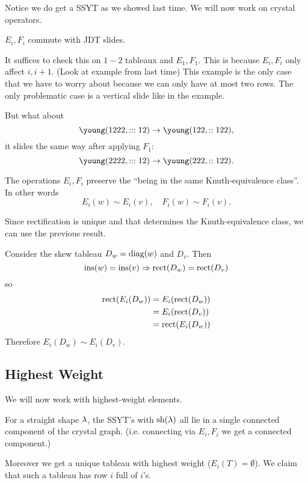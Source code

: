 \documentclass[12pt]{memoir}
\begin{document}
Notice we do get a SSYT as we showed last time. We will now work on crystal operators. 

\begin{Th}
    $E_i,F_i$ commute with JDT slides.
\end{Th}
It suffices to check this on $1-2$ tableaux and $E_1,F_1$. This is because $E_i,F_i$ only affect $i,i+1$. (Look at example from last time) This example is the only case that we have to worry about because we can only have at most two rows. The only problematic case is a vertical slide like in the example.\par 
But what about 
$$\young(1222,:::12)\to\young(122,::122),$$
it slides the same way after applying $F_1$:
$$\young(2222,:::12)\to\young(222,::122).$$

\begin{Th}
The operations $E_i,F_i$ preserve the ``being in the same Knuth-equivalence class''. In other words 
$$E_i(w)\sim E_i(v),\quad F_i(w)\sim F_i(v).$$    
\end{Th}

Since rectification is unique and that determines the Knuth-equivalence class, we can use the previous result.

\begin{ptcbr}
    Consider the skew tableau $D_w=\operatorname{diag}(w)$ and $D_v$. Then 
    $$\operatorname{ins}(w)=\operatorname{ins}(v)\Rightarrow \operatorname{rect}(D_w)=\operatorname{rect}(D_v)$$
    so 
    \begin{align*}
        \operatorname{rect}(E_i(D_w))&=E_i(\operatorname{rect}(D_w))\\
        &=E_i(\operatorname{rect}(D_v))\\
        &=\operatorname{rect}(E_i(D_w))
    \end{align*} 
    Therefore $E_i(D_w)\sim E_i(D_v)$.
\end{ptcbr}

\subsection{Highest Weight}
We will now work with highest-weight elements.

\begin{Lem}
    For a straight shape $\lambda$, the SSYT's with $\operatorname{sh}(\lambda)$ all lie in a single connected component of the crystal graph. (i.e. connecting via $E_i,F_i$ we get a connected component.)\par 
    Moreover we get a unique tableau with highest weight ($E_i(T)=\emptyset$). We claim that such a tableau has row $i$ full of $i$'s.
\end{Lem}
\end{document}
